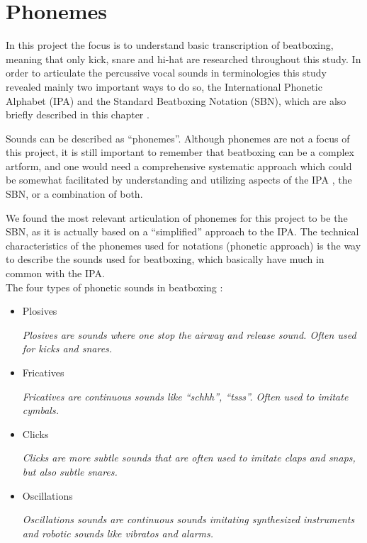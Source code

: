 \section{Phonemes}
\label{SBN}
In this project the focus is to understand basic transcription of beatboxing, meaning that only kick, snare and hi-hat are researched throughout this study. In order to articulate the percussive vocal sounds in terminologies this study revealed mainly two important ways to do so, the International Phonetic Alphabet (IPA) \citep{ipa} and the Standard Beatboxing Notation (SBN), which are also briefly described in this chapter \citep{humanbeatboxing}.


Sounds can be described as “phonemes”. Although phonemes are not a focus of this project, it is still important to remember that beatboxing can be a complex artform, and one would need a comprehensive systematic approach which could be somewhat facilitated by understanding and utilizing aspects of the IPA \citep{ipa}, the SBN, or a combination of both.


We found the most relevant articulation of phonemes for this project to be the SBN, as it is actually based on a “simplified” approach to the IPA. The technical characteristics of the phonemes used for notations (phonetic approach) is the way to describe the sounds used for beatboxing, which basically have much in common with the IPA. \\


The four types of phonetic sounds in beatboxing \citep{BeatboxBible}:

  \begin{itemize} 
	\item Plosives

	
	\textit{Plosives are sounds where one stop the airway and release sound. Often used for kicks and snares.}
  
	\item Fricatives
	
	
	\textit{Fricatives are continuous sounds like “schhh”, “tsss”. Often used to imitate cymbals.}
	
	\item Clicks
	
	
	\textit{Clicks are more subtle sounds that are often used to imitate claps and snaps, but also subtle snares.}
	
	\item Oscillations
	
	\textit{Oscillations sounds are continuous sounds imitating synthesized instruments and robotic sounds like vibratos and alarms.}
\end{itemize}

